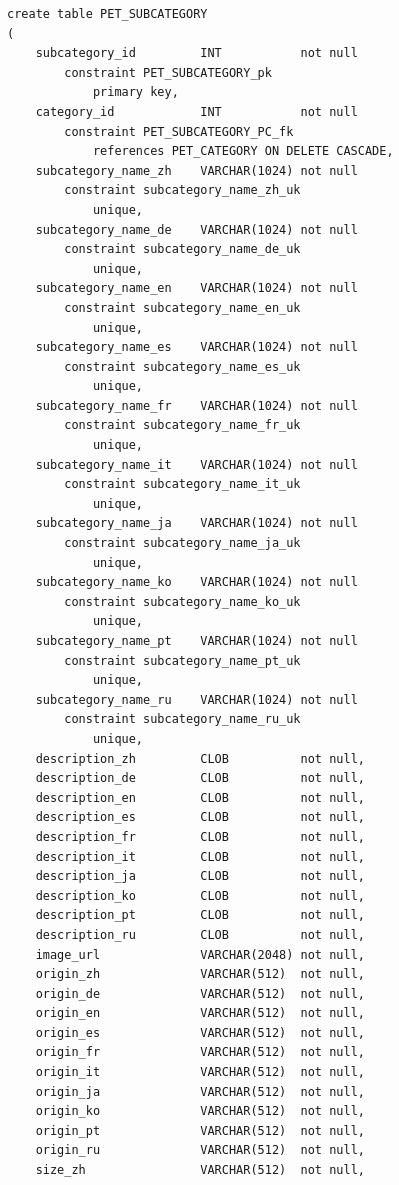 \begin{verbatim}
create table PET_SUBCATEGORY
(
    subcategory_id         INT           not null
        constraint PET_SUBCATEGORY_pk
            primary key,
    category_id            INT           not null
        constraint PET_SUBCATEGORY_PC_fk
            references PET_CATEGORY ON DELETE CASCADE,
    subcategory_name_zh    VARCHAR(1024) not null
        constraint subcategory_name_zh_uk
            unique,
    subcategory_name_de    VARCHAR(1024) not null
        constraint subcategory_name_de_uk
            unique,
    subcategory_name_en    VARCHAR(1024) not null
        constraint subcategory_name_en_uk
            unique,
    subcategory_name_es    VARCHAR(1024) not null
        constraint subcategory_name_es_uk
            unique,
    subcategory_name_fr    VARCHAR(1024) not null
        constraint subcategory_name_fr_uk
            unique,
    subcategory_name_it    VARCHAR(1024) not null
        constraint subcategory_name_it_uk
            unique,
    subcategory_name_ja    VARCHAR(1024) not null
        constraint subcategory_name_ja_uk
            unique,
    subcategory_name_ko    VARCHAR(1024) not null
        constraint subcategory_name_ko_uk
            unique,
    subcategory_name_pt    VARCHAR(1024) not null
        constraint subcategory_name_pt_uk
            unique,
    subcategory_name_ru    VARCHAR(1024) not null
        constraint subcategory_name_ru_uk
            unique,
    description_zh         CLOB          not null,
    description_de         CLOB          not null,
    description_en         CLOB          not null,
    description_es         CLOB          not null,
    description_fr         CLOB          not null,
    description_it         CLOB          not null,
    description_ja         CLOB          not null,
    description_ko         CLOB          not null,
    description_pt         CLOB          not null,
    description_ru         CLOB          not null,
    image_url              VARCHAR(2048) not null,
    origin_zh              VARCHAR(512)  not null,
    origin_de              VARCHAR(512)  not null,
    origin_en              VARCHAR(512)  not null,
    origin_es              VARCHAR(512)  not null,
    origin_fr              VARCHAR(512)  not null,
    origin_it              VARCHAR(512)  not null,
    origin_ja              VARCHAR(512)  not null,
    origin_ko              VARCHAR(512)  not null,
    origin_pt              VARCHAR(512)  not null,
    origin_ru              VARCHAR(512)  not null,
    size_zh                VARCHAR(512)  not null,

\end{verbatim}
